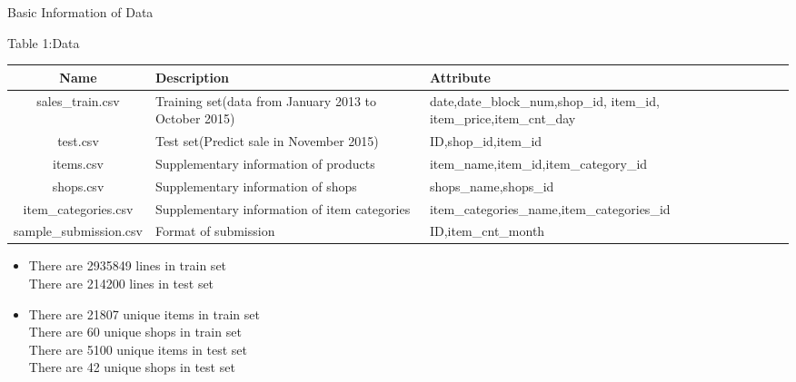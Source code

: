 \documentclass[
size=12pt,
paper=smartboard,  %
mode=present, 		%
display=slides, 	%
style=tuliplab,  	%
pauseslide,
fleqn,leqno]{powerdot}
\begin{document}
	
	\begin{slide}[toc=Basic Information of Data]{Basic Information of Data}
		\smallskip
		\centerline{\normalsize{Table 1:Data}}
		\begin{tabular}{cp{7cm}p{7cm}}
			\hline
			Name&Description&Attribute\\
			\hline
			sales\_train.csv& Training set(data from January 2013 to October 2015)&date,date_block_num,shop_id, item_id, item_price,item_cnt_day\\
			test.csv& Test set(Predict sale in November 2015) & ID,shop_id,item_id\\
			items.csv& Supplementary information of products &item_name,item_id,item_category_id\\
			shops.csv& Supplementary information of shops & shops_name,shops_id\\
			item_categories.csv& Supplementary information of item categories & item_categories_name,item_categories_id\\
			sample_submission.csv& Format of submission & ID,item_cnt_month\\
			\hline
		\end{tabular}
		\begin{itemize}
			\bigskip
			\item 
			There are 2935849 lines in train set\\
			There are 214200 lines in test set\\
			\vbox{}
			\item 
			There are 21807 unique items in train set\\
			There are 60 unique shops in train set\\
			There are 5100 unique items in test set\\
			There are 42 unique shops in test set
		\end{itemize}
	\end{slide}
	
\end{document}
